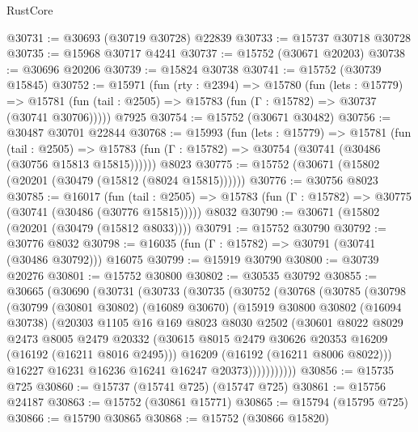 \begin{lexlean}{RustCore}
\begin{coremodule}
@30731 := @30693 (@30719 @30728) @22839
@30733 := @15737 @30718 @30728
@30735 := @15968 @30717 @4241
@30737 := @15752 (@30671 @20203)
@30738 := @30696 @20206
@30739 := @15824 @30738
@30741 := @15752 (@30739 @15845)
@30752 := @15971
    (fun (rty : @2394) =>
    @15780
      (fun (lets : @15779) =>
      @15781 (fun (tail : @2505) => @15783 (fun (Γ : @15782) => @30737 (@30741 @30706)))))
    @7925
@30754 := @15752 (@30671 @30482)
@30756 := @30487 @30701 @22844
@30768 := @15993
    (fun (lets : @15779) =>
    @15781
      (fun (tail : @2505) =>
      @15783 (fun (Γ : @15782) => @30754 (@30741 (@30486 (@30756 @15813 @15815))))))
    @8023
@30775 := @15752 (@30671 (@15802 (@20201 (@30479 (@15812 (@8024 @15815))))))
@30776 := @30756 @8023
@30785 := @16017
    (fun (tail : @2505) => @15783 (fun (Γ : @15782) => @30775 (@30741 (@30486 (@30776 @15815)))))
    @8032
@30790 := @30671 (@15802 (@20201 (@30479 (@15812 @8033))))
@30791 := @15752 @30790
@30792 := @30776 @8032
@30798 := @16035 (fun (Γ : @15782) => @30791 (@30741 (@30486 @30792))) @16075
@30799 := @15919 @30790
@30800 := @30739 @20276
@30801 := @15752 @30800
@30802 := @30535 @30792
@30855 := @30665
    (@30690
      (@30731
        (@30733
          (@30735
            (@30752
              (@30768
                (@30785
                  (@30798
                    (@30799
                      (@30801 @30802)
                      (@16089 @30670)
                      (@15919
                        @30800
                        @30802
                        (@16094 @30738)
                        (@20303
                          @1105
                          @16
                          @169
                          @8023
                          @8030
                          @2502
                          (@30601
                            @8022
                            @8029
                            @2473
                            @8005
                            @2479
                            @20332
                            (@30615 @8015 @2479 @30626 @20353 @16209 (@16192 (@16211 @8016 @2495)))
                            @16209
                            (@16192 (@16211 @8006 @8022)))
                          @16227
                          @16231
                          @16236
                          @16241
                          @16247
                          @20373)))))))))))
@30856 := @15735 @725
@30860 := @15737 (@15741 @725) (@15747 @725)
@30861 := @15756 @24187
@30863 := @15752 (@30861 @15771)
@30865 := @15794 (@15795 @725)
@30866 := @15790 @30865
@30868 := @15752 (@30866 @15820)

\end{coremodule}
\end{lexlean}
